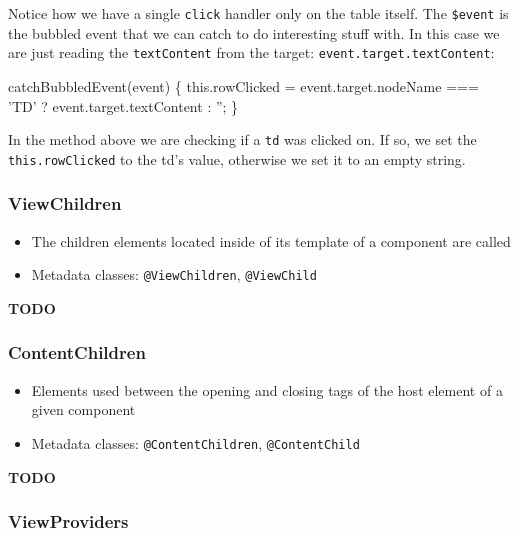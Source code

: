 \documentclass[12pt,]{article}
\newenvironment{Shaded}{}{}
\newcommand{\KeywordTok}[1]{\textcolor[rgb]{0.00,0.00,1.00}{{#1}}}
\newcommand{\FunctionTok}[1]{{#1}}
\newcommand{\NormalTok}[1]{{#1}}
\providecommand{\tightlist}{%
  \setlength{\itemsep}{0pt}\setlength{\parskip}{0pt}}
\begin{document}
Notice how we have a single \texttt{click} handler only on the table
itself. The \texttt{\$event} is the bubbled event that we can catch to
do interesting stuff with. In this case we are just reading the
\texttt{textContent} from the target: \texttt{event.target.textContent}:

\begin{Shaded}
\begin{Highlighting}[numbers=left,,]
\FunctionTok{catchBubbledEvent}\NormalTok{(event) \{}
  \KeywordTok{this}\NormalTok{.}\FunctionTok{rowClicked} \NormalTok{= event.}\FunctionTok{target}\NormalTok{.}\FunctionTok{nodeName} \NormalTok{=== 'TD' ? event.}\FunctionTok{target}\NormalTok{.}\FunctionTok{textContent} \NormalTok{: '';}
\NormalTok{\}}
\end{Highlighting}
\end{Shaded}

In the method above we are checking if a \texttt{td} was clicked on. If
so, we set the \texttt{this.rowClicked} to the td's value, otherwise we
set it to an empty string.

\subsubsection{ViewChildren}\label{viewchildren}

\begin{itemize}
\tightlist
\item
  The children elements located inside of its template of a component
  are called
\item
  Metadata classes: \texttt{@ViewChildren}, \texttt{@ViewChild}
\end{itemize}

\textbf{TODO}

\subsubsection{ContentChildren}\label{contentchildren}

\begin{itemize}
\tightlist
\item
  Elements used between the opening and closing tags of the host element
  of a given component
\item
  Metadata classes: \texttt{@ContentChildren}, \texttt{@ContentChild}
\end{itemize}

\textbf{TODO}

\subsubsection{ViewProviders}\label{viewproviders}
\end{document}
